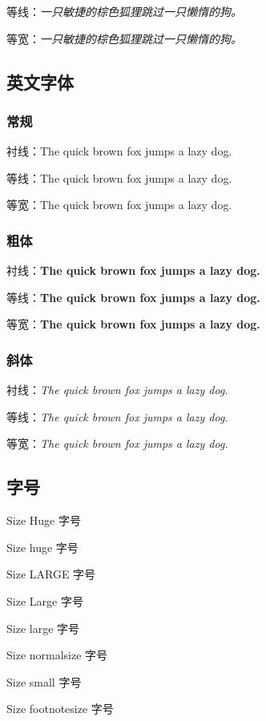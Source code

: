 等线：{\sffamily\itshape 一只敏捷的棕色狐狸跳过一只懒惰的狗。}

等宽：{\ttfamily\itshape 一只敏捷的棕色狐狸跳过一只懒惰的狗。}

\subsection{英文字体}

\subsubsection{常规}
衬线：{\rmfamily The quick brown fox jumps a lazy dog.}

等线：{\sffamily The quick brown fox jumps a lazy dog.}

等宽：{\ttfamily The quick brown fox jumps a lazy dog.}

\subsubsection{粗体}
衬线：{\rmfamily\bfseries The quick brown fox jumps a lazy dog.}

等线：{\sffamily\bfseries The quick brown fox jumps a lazy dog.}

等宽：{\ttfamily\bfseries The quick brown fox jumps a lazy dog.}

\subsubsection{斜体}
衬线：{\rmfamily\itshape The quick brown fox jumps a lazy dog.}

等线：{\sffamily\itshape The quick brown fox jumps a lazy dog.}

等宽：{\ttfamily\itshape The quick brown fox jumps a lazy dog.}

\subsection{字号}
{\Huge Size Huge 字号}

{\huge Size huge 字号}

{\LARGE Size LARGE 字号}

{\Large Size Large 字号}

{\large Size large 字号}

{\normalsize Size normalsize 字号}

{\small Size small 字号}

{\footnotesize Size footnotesize 字号}

